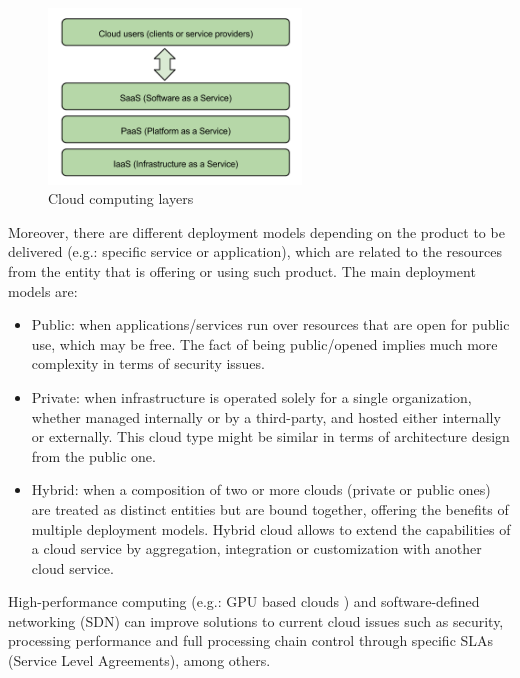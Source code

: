 \begin{figure}[htb]
\begin{center}
\includegraphics[width=0.6\textwidth]{./images/Cloud_computing_layers.png}
\caption{Cloud computing layers}
\label{F:cloudComputingLayers}
\end{center}
\end{figure}

Moreover, there are different deployment models depending on the product to be delivered (e.g.: specific service or application), which are related to the resources from the entity that is offering or using such product. The main deployment models are:

\begin{itemize}
\item Public: when applications/services run over resources that are open for public use, which may be free. The fact of being public/opened implies much more complexity in terms of security issues.
\item Private: when infrastructure is operated solely for a single organization, whether managed internally or by a third-party, and hosted either internally or externally. This cloud type might be similar in terms of architecture design from the public one.
\item Hybrid: when a composition of two or more clouds (private or public ones) are treated as distinct entities but are bound together, offering the benefits of multiple deployment models. Hybrid cloud allows to extend the capabilities of a cloud service by aggregation, integration or customization with another cloud service.
\end{itemize}

High-performance computing (e.g.: GPU based clouds \cite{gpu}) and software-defined networking (SDN) can improve solutions to current cloud issues such as security, processing performance and full processing chain control through specific SLAs (Service Level Agreements), among others.

